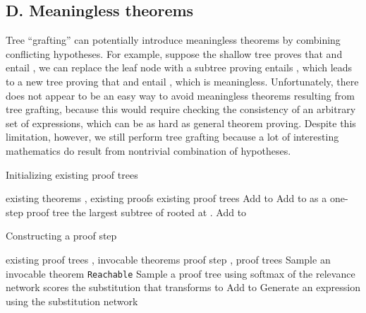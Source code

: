 \documentclass{article}
\begin{document}
\subsection*{D. Meaningless theorems}
Tree ``grafting'' can potentially introduce meaningless theorems by combining conflicting hypotheses. 
For example, 
suppose the shallow tree proves that  and  entail , we can replace the leaf node  with a subtree proving  entails , which leads to a new tree proving that  and  entail , which is meaningless. Unfortunately, there does not appear to be an easy way to avoid meaningless theorems resulting from tree grafting, because this would require checking the consistency of an arbitrary set of expressions, which can be as hard as general theorem proving. Despite this limitation, however, we still perform tree grafting because a lot of interesting mathematics do result from nontrivial combination of hypotheses. 

\begin{algorithm}[t]
   \caption{Initializing existing proof trees}
   \label{algo:initial}
\begin{algorithmic}
 existing theorems , existing proofs 
 existing proof trees 
    \STATE 
            \STATE Add  to 
        \ENDFOR
        \STATE Add  to  as a one-step proof tree
    \ENDFOR
            \STATE  the largest subtree of  rooted at . 
            \STATE Add  to 
        \ENDFOR
    \ENDFOR
\end{algorithmic}
\end{algorithm}

\begin{algorithm}[!ht]
   \caption{Constructing a proof step}
   \label{algo:step}
\begin{algorithmic}
 existing proof trees , invocable theorems 
 proof step , proof trees 
    \STATE Sample an invocable theorem 
    \STATE 
        \STATE \texttt{Reachable}
        \STATE{}
        \STATE Sample a proof tree  using softmax of the relevance network scores
        \STATE  the substitution that transforms  to 
        \STATE Add  to 
    \ENDFOR
            \STATE Generate an expression  using the substitution network
            \STATE 
        \ENDIF
    \ENDFOR
\end{algorithmic}
\end{algorithm}
\end{document}
